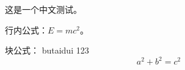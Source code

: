 \documentclass[12pt]{article}
\begin{document}
这是一个中文测试。

行内公式：\( E = mc^2 \)。

块公式：
butaidui
123
\[
a^2 + b^2 = c^2
\]
\end{document}
